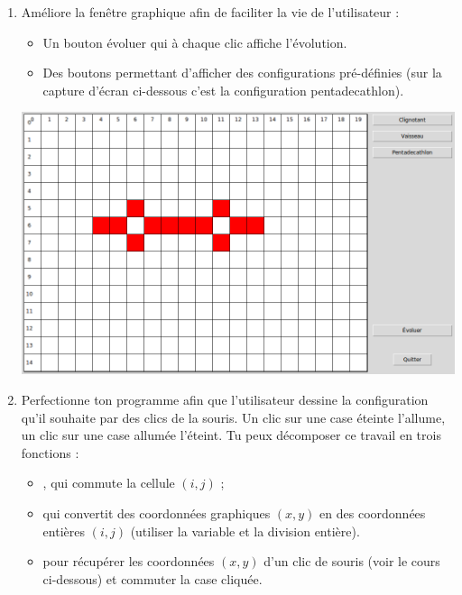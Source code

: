 \documentclass[11pt,class=report,crop=false]{standalone}
\begin{document}
 


\begin{activite}[Itérations]


\begin{enumerate}
  \item  Améliore la fenêtre graphique afin de faciliter la vie de l'utilisateur :
  \begin{itemize}
    \item Un bouton \og{}évoluer\fg{} qui à chaque clic affiche l'évolution.
    \item Des boutons permettant d'afficher des configurations pré-définies (sur la capture d'écran ci-dessous c'est la configuration \og{}pentadecathlon\fg{}).
  \end{itemize}
  
\begin{center}
\includegraphics[scale=\myscale,scale=0.3]{ecran-vie-4a}
\end{center}  
  
  \item Perfectionne ton programme afin que l'utilisateur dessine la configuration qu'il souhaite par des clics de la souris. Un clic sur une case éteinte l'allume, un clic sur une case allumée l'éteint. 
  Tu peux décomposer ce travail en trois fonctions :
  \begin{itemize}
    \item {}, qui commute la cellule $(i,j)$ ;
    \item {} qui convertit des coordonnées graphiques $(x,y)$ en des coordonnées entières $(i,j)$ (utiliser la variable  et la division entière).
    \item {} pour récupérer les coordonnées $(x,y)$ d'un clic de souris (voir le cours ci-dessous) et commuter la case cliquée.
  \end{itemize}   
    

\end{enumerate}
\end{activite}
\end{document}
